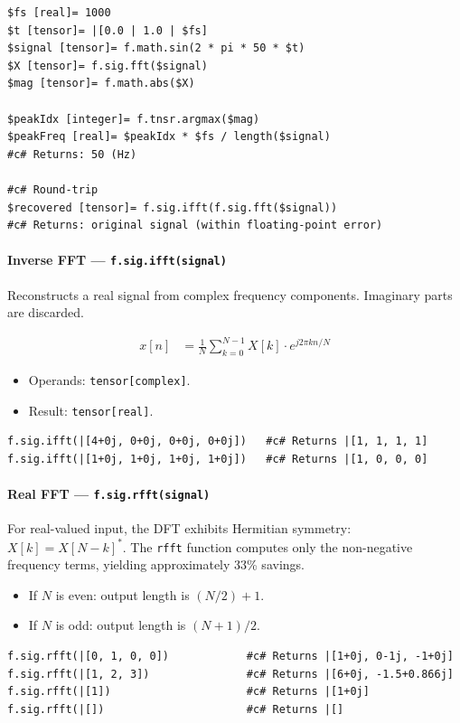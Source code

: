 \begin{verbatim}
$fs [real]= 1000
$t [tensor]= |[0.0 | 1.0 | $fs]
$signal [tensor]= f.math.sin(2 * pi * 50 * $t)
$X [tensor]= f.sig.fft($signal)
$mag [tensor]= f.math.abs($X)

$peakIdx [integer]= f.tnsr.argmax($mag)
$peakFreq [real]= $peakIdx * $fs / length($signal)
#c# Returns: 50 (Hz)

#c# Round-trip
$recovered [tensor]= f.sig.ifft(f.sig.fft($signal))
#c# Returns: original signal (within floating-point error)
\end{verbatim}

\paragraph{Inverse FFT --- \texttt{f.sig.ifft(signal)}}
Reconstructs a real signal from complex frequency components. Imaginary parts are discarded.

\begin{align}
x[n] &= \frac{1}{N} \sum_{k=0}^{N-1} X[k] \cdot e^{j 2\pi k n / N} \label{eq:sig-ifft}
\end{align}

\begin{itemize}
\item Operands: \texttt{tensor[complex]}.
\item Result: \texttt{tensor[real]}.
\end{itemize}

\begin{verbatim}
f.sig.ifft(|[4+0j, 0+0j, 0+0j, 0+0j])   #c# Returns |[1, 1, 1, 1]
f.sig.ifft(|[1+0j, 1+0j, 1+0j, 1+0j])   #c# Returns |[1, 0, 0, 0]
\end{verbatim}

\paragraph{Real FFT --- \texttt{f.sig.rfft(signal)}}
For real-valued input, the DFT exhibits Hermitian symmetry: $X[k] = X[N{-}k]^*$. The \texttt{rfft} function computes only the non-negative frequency terms, yielding approximately 33\% savings.

\begin{itemize}
\item If $N$ is even: output length is $(N/2) + 1$.
\item If $N$ is odd: output length is $(N+1)/2$.
\end{itemize}

\begin{verbatim}
f.sig.rfft(|[0, 1, 0, 0])            #c# Returns |[1+0j, 0-1j, -1+0j]
f.sig.rfft(|[1, 2, 3])               #c# Returns |[6+0j, -1.5+0.866j]
f.sig.rfft(|[1])                     #c# Returns |[1+0j]
f.sig.rfft(|[])                      #c# Returns |[]
\end{verbatim}

